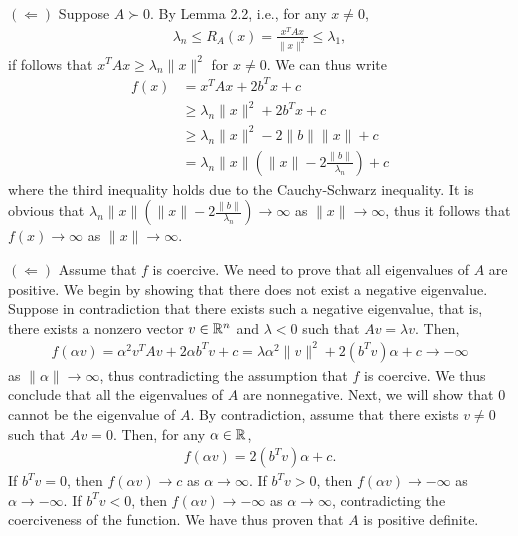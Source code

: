 \documentclass{ExerciseSheet}
\begin{document}
\begin{solution}
$(\Leftarrow)$ Suppose $A\succ0$. By Lemma 2.2, i.e., for any $x\not=0$,
\begin{align*}
    \lambda_n\leq R_A(x)=\frac{x^TAx}{\lVert x\rVert^2}\leq \lambda_1,
\end{align*}
if follows that $x^TAx\geq \lambda_n\lVert x\rVert^2$ for $x\not=0$. We can thus write
\begin{align*}
    f(x)&=x^TAx+2b^Tx+c\\
    &\geq \lambda_n\lVert x\rVert^2+2b^Tx+c \\
    &\geq \lambda_n\lVert x\rVert^2-2\lVert b\rVert\lVert x\rVert +c \\
    & = \lambda_n\lVert x\rVert\left(\lVert x\rVert-2\frac{\lVert b\rVert}{\lambda_n}\right)+c
\end{align*}
where the third inequality holds due to the Cauchy-Schwarz inequality. It is obvious that $\lambda_n\lVert x\rVert\left(\lVert x\rVert-2\frac{\lVert b\rVert}{\lambda_n}\right)\rightarrow\infty$ as $\lVert x\rVert\rightarrow \infty$, thus it follows that $f(x)\rightarrow\infty$ as $\lVert x\rVert\rightarrow \infty$.

$(\Leftarrow)$ Assume that $f$ is coercive. We need to prove that all eigenvalues of $A$ are positive. We begin by showing that there does not exist a negative eigenvalue. Suppose in contradiction that there exists such a negative eigenvalue, that is, there exists a nonzero vector $v\in\mathbb{R}^n$ and $\lambda<0$ such that $Av=\lambda v$. Then,
\begin{align*}
    f(\alpha v)=\alpha^2 v^TAv+2\alpha b^Tv+c = \lambda\alpha^2\lVert v\rVert^2+2(b^Tv)\alpha+c \rightarrow -\infty
\end{align*}
as $\lVert \alpha\rVert\rightarrow\infty$, thus contradicting the assumption that $f$ is coercive. We thus conclude that all the eigenvalues of $A$ are nonnegative. Next, we will show that $0$ cannot be the eigenvalue of $A$. By contradiction, assume that there exists $v\not=0$ such that $Av=0$. Then, for any $\alpha \in\mathbb{R}$, 
\begin{align*}
    f(\alpha v)= 2(b^Tv)\alpha+c.
\end{align*}
If $b^Tv=0$, then $f(\alpha v)\rightarrow c$ as $\alpha \rightarrow\infty$. If $b^Tv>0$, then $f(\alpha v)\rightarrow -\infty$ as $\alpha \rightarrow-\infty$. If $b^Tv<0$, then $f(\alpha v)\rightarrow -\infty$ as $\alpha \rightarrow\infty$, contradicting the coerciveness of the function. We have thus proven that $A$ is positive definite.


\end{solution}
\fi
\end{document}
